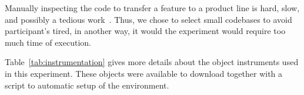 Manually inspecting the code to transfer a feature to a product line is hard, slow, and possibly a tedious work~\cite{Mahmood2021}. Thus, we chose to select small codebases to avoid participant's tired, in another way, it would the experiment would require too much time of execution. 

Table~\ref{tab:instrumentation} gives more details about the object instruments used in this experiment. These objects were available to download together with a script to automatic setup of the environment.  





